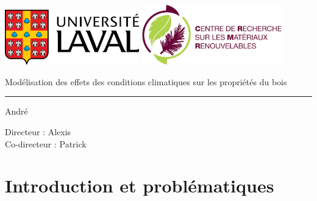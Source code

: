 \documentclass[a4paper,12pt]{report}
\date{Québec, le 19 avril 2018}
\begin{document}
	
	\begin{titlepage}
		\begin{center}
			
			\includegraphics[height=2.4cm]{logo_laval} \hspace{2.9cm}
			\includegraphics[height=2.6cm]{crmr_logo}
			
			\vspace{\fill}
			
			\begin{center}
				\Huge Modélisation des effets des conditions climatiques sur les propriétés du bois
			\end{center}
			
			\hrule height 1pt
			
			\begin{flushright}
				\Large André 
			\end{flushright}
			
			\vspace{\fill}
			
			\Large Directeur : Alexis  \\ Co-directeur : Patrick 
            \date{19 avril 2018}
		\end{center}
	\end{titlepage}
	
	\tableofcontents
	\listoffigures
	


\chapter{Introduction et problématiques}
\end{document}
